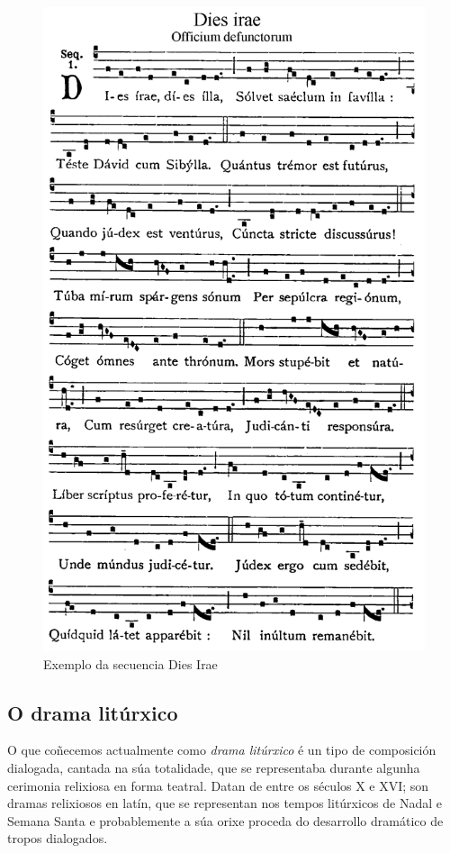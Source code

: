 \documentclass[a4paper, twoside]{templates/ociamthesis}
\begin{document}
\begin{figure}[ht]

{\centering \includegraphics[width=0.75\linewidth]{figures/ud-03/Dies-irae} 

}

\caption[Secuencia Dies irae]{Exemplo da secuencia Dies Irae}\label{fig:Dies-irae}
\end{figure}

\hypertarget{o-drama-lituxfarxico}{%
\subsection{O drama litúrxico}\label{o-drama-lituxfarxico}}

O que coñecemos actualmente como \emph{drama litúrxico} é un tipo de composición dialogada, cantada na súa totalidade, que se representaba durante algunha cerimonia relixiosa en forma teatral. Datan de entre os séculos X e XVI; son dramas relixiosos en latín, que se representan nos tempos litúrxicos de Nadal e Semana Santa e probablemente a súa orixe proceda do desarrollo dramático de tropos dialogados.
\end{document}
